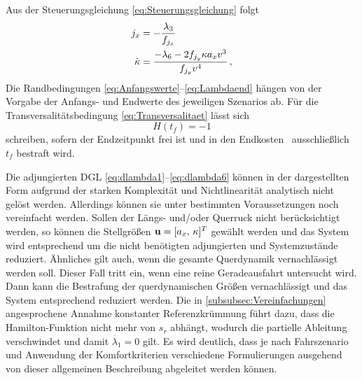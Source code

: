 Aus der Steuerungsgleichung \eqref{eq:Steuerungsgleichung} folgt 
\begin{align}
j_x &= -\frac{\lambda_3}{f_{j_x}}  \label{eq:jx} \\
\dot{\kappa} &= \frac{-\lambda_6-2f_{j_y} \kappa a_xv^3}{f_{j_y} v^4} \label{eq:dkappa}\,,
\end{align}
Die Randbedingungen \eqref{eq:Anfangswerte}--\eqref{eq:Lambdaend} hängen von der Vorgabe der Anfangs- und Endwerte des jeweiligen Szenarios ab. Für die Transversalitätsbedingung \eqref{eq:Transversalitaet} lässt sich 
\begin{equation}
	H(t_f) = -1
\end{equation}
schreiben, sofern der Endzeitpunkt frei ist und in den Endkosten \Vofxoftf~ausschließlich $t_f$ bestraft wird.

Die adjungierten \gls{DGL} \eqref{eq:dlambda1}--\eqref{eq:dlambda6} können in der dargestellten Form aufgrund der starken Komplexität und Nichtlinearität analytisch nicht gelöst werden. Allerdings können sie unter bestimmten Voraussetzungen noch vereinfacht werden. Sollen der Längs- und/oder Querruck nicht berücksichtigt werden, so können die Stellgrößen $\boldsymbol{\mathrm{u}} = [a_x,\,\kappa]^T$ gewählt werden und das System wird entsprechend um die nicht benötigten adjungierten und Systemzustände reduziert. Ähnliches gilt auch, wenn die gesamte Querdynamik vernachlässigt werden soll. Dieser Fall tritt ein, wenn eine reine Geradeausfahrt untersucht wird. Dann kann die Bestrafung der querdynamischen Größen vernachlässigt und das System entsprechend reduziert werden. Die in \ref{subsubsec:Vereinfachungen} angesprochene Annahme konstanter Referenzkrümmung führt dazu, dass die Hamilton-Funktion nicht mehr von $s_r$ abhängt, wodurch die partielle Ableitung verschwindet und damit $\dot{\lambda_1} = 0$ gilt. Es wird deutlich, dass je nach Fahrszenario und Anwendung der Komfortkriterien verschiedene Formulierungen ausgehend von dieser allgemeinen Beschreibung abgeleitet werden können.

